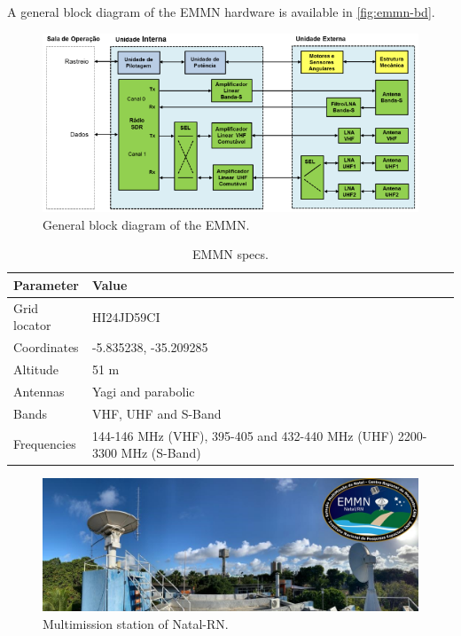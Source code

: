 A general block diagram of the EMMN hardware is available in \autoref{fig:emmn-bd}.

\begin{figure}[!ht]
    \begin{center}
        \includegraphics[width=\textwidth]{figures/emmn-bd}
        \caption{General block diagram of the EMMN.}
        \label{fig:emmn-bd}
    \end{center}
\end{figure}

\begin{table}[!h]
    \centering
    \begin{tabular}{lC{6cm}}
        \toprule[1.5pt]
        \textbf{Parameter} & \textbf{Value} \\
        \midrule
        Grid locator    & HI24JD59CI \\
        Coordinates     & -5.835238, -35.209285 \\
        Altitude        & 51 m \\
        Antennas        & Yagi and parabolic \\
        Bands           & VHF, UHF and S-Band\\
        Frequencies     & 144-146 MHz (VHF), 395-405 and 432-440 MHz (UHF) 2200-3300 MHz (S-Band)\\
        \bottomrule[1.5pt]
    \end{tabular}
    \caption{EMMN specs.}
    \label{tab:emmn-info}
\end{table}

\begin{figure}[!ht]
    \begin{center}
        \includegraphics[width=\textwidth]{figures/inpe-emmn}
        \caption{Multimission station of Natal-RN.}
        \label{fig:emmn}
    \end{center}
\end{figure}

